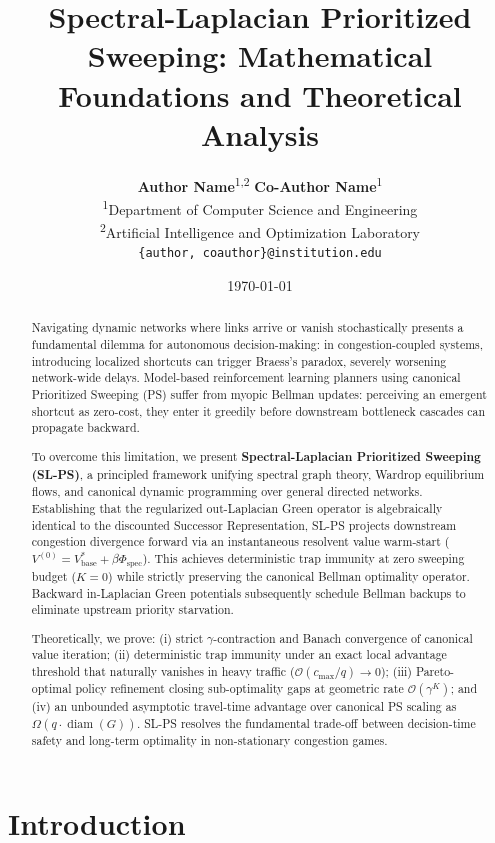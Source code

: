 \documentclass[11pt,a4paper]{article}
\title{\textbf{Spectral-Laplacian Prioritized Sweeping: Mathematical Foundations and Theoretical Analysis}}
\author{
  \textbf{Author Name}\textsuperscript{1,2} \quad \textbf{Co-Author Name}\textsuperscript{1} \\
  \textsuperscript{1}Department of Computer Science and Engineering \\
  \textsuperscript{2}Artificial Intelligence and Optimization Laboratory \\
  \texttt{\{author, coauthor\}@institution.edu}
}
\date{\today}
\begin{document}
\maketitle

\begin{abstract}
Navigating dynamic networks where links arrive or vanish stochastically presents a fundamental dilemma for autonomous decision-making: in congestion-coupled systems, introducing localized shortcuts can trigger Braess's paradox, severely worsening network-wide delays. Model-based reinforcement learning planners using canonical Prioritized Sweeping (PS) suffer from myopic Bellman updates: perceiving an emergent shortcut as zero-cost, they enter it greedily before downstream bottleneck cascades can propagate backward.

To overcome this limitation, we present \textbf{Spectral-Laplacian Prioritized Sweeping (SL-PS)}, a principled framework unifying spectral graph theory, Wardrop equilibrium flows, and canonical dynamic programming over general directed networks. Establishing that the regularized out-Laplacian Green operator is algebraically identical to the discounted Successor Representation, SL-PS projects downstream congestion divergence forward via an instantaneous resolvent value warm-start ($V^{(0)} = V_{\text{base}}^* + \beta \Phi_{\text{spec}}$). This achieves deterministic trap immunity at zero sweeping budget ($K = 0$) while strictly preserving the canonical Bellman optimality operator. Backward in-Laplacian Green potentials subsequently schedule Bellman backups to eliminate upstream priority starvation.

Theoretically, we prove: (i) strict $\gamma$-contraction and Banach convergence of canonical value iteration; (ii) deterministic trap immunity under an exact local advantage threshold that naturally vanishes in heavy traffic ($\mathcal{O}(c_{\max}/q) \to 0$); (iii) Pareto-optimal policy refinement closing sub-optimality gaps at geometric rate $\mathcal{O}(\gamma^K)$; and (iv) an unbounded asymptotic travel-time advantage over canonical PS scaling as $\Omega(q \cdot \operatorname{diam}(G))$. SL-PS resolves the fundamental trade-off between decision-time safety and long-term optimality in non-stationary congestion games.
\end{abstract}

\newpage

\section{Introduction}
\label{sec:intro}
\end{document}

